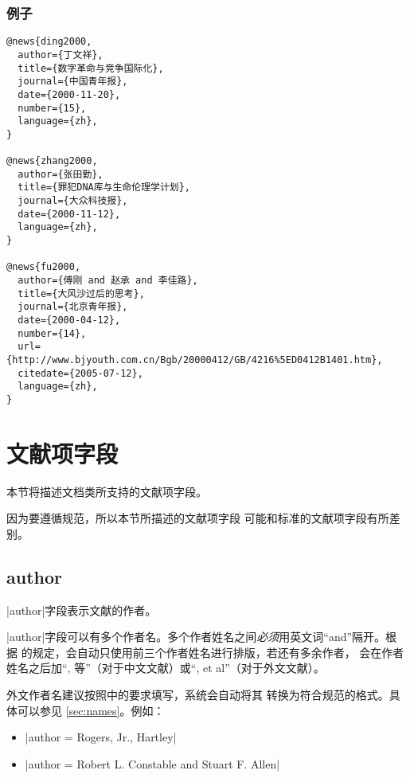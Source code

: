 \subsubsection{例子}

\begin{verbatim}
@news{ding2000,
  author={丁文祥},
  title={数字革命与竞争国际化},
  journal={中国青年报},
  date={2000-11-20},
  number={15},
  language={zh},
}

@news{zhang2000,
  author={张田勤},
  title={罪犯DNA库与生命伦理学计划},
  journal={大众科技报},
  date={2000-11-12},
  language={zh},
}

@news{fu2000,
  author={傅刚 and 赵承 and 李佳路},
  title={大风沙过后的思考},
  journal={北京青年报},
  date={2000-04-12},
  number={14},
  url={http://www.bjyouth.com.cn/Bgb/20000412/GB/4216%5ED0412B1401.htm},
  citedate={2005-07-12},
  language={zh},
}
\end{verbatim}


\section{文献项字段}\label{sec:bib-field}

本节将描述{\njuthesis}文档类所支持的文献项字段。

\begin{note}
因为要遵循规范\cite{gbt7714-2005}，所以本节所描述的文献项字段
可能和标准{\BibTeX}的文献项字段有所差别。
\end{note}

\subsection{author}\label{subsec:bibfield-author}

|author|字段表示文献的作者。

|author|字段可以有多个作者名。多个作者姓名之间\emph{必须}用英文词``and''隔开。根据
\cite{gbt7714-2005}的规定，{\BibTeX}会自动只使用前三个作者姓名进行排版，若还有多余作者，
会在作者姓名之后加``, 等''（对于中文文献）或``, et al''（对于外文文献）。

外文作者名建议按照\cite[157]{lamport1994latex}中的要求填写，{\BibTeX}系统会自动将其
转换为符合规范\cite{gbt7714-2005}的格式。具体可以参见
\ref{sec:names}。例如：
\begin{itemize}
\item |author = {Rogers, Jr., Hartley}|
\item |author = {Robert L. Constable and Stuart F. Allen}|
\end{itemize}

